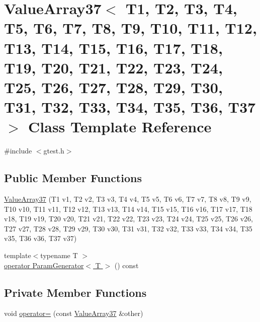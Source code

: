 \hypertarget{classtesting_1_1internal_1_1ValueArray37}{\section{\-Value\-Array37$<$ \-T1, \-T2, \-T3, \-T4, \-T5, \-T6, \-T7, \-T8, \-T9, \-T10, \-T11, \-T12, \-T13, \-T14, \-T15, \-T16, \-T17, \-T18, \-T19, \-T20, \-T21, \-T22, \-T23, \-T24, \-T25, \-T26, \-T27, \-T28, \-T29, \-T30, \-T31, \-T32, \-T33, \-T34, \-T35, \-T36, \-T37 $>$ \-Class \-Template \-Reference}
\label{dc/d48/classtesting_1_1internal_1_1ValueArray37}
}


{\ttfamily \#include $<$gtest.\-h$>$}

\subsection*{\-Public \-Member \-Functions}
\begin{DoxyCompactItemize}
\item 
\hyperlink{classtesting_1_1internal_1_1ValueArray37_ad31713f9c0ce199eb237eadb0b9d782e}{\-Value\-Array37} (\-T1 v1, \-T2 v2, \-T3 v3, \-T4 v4, \-T5 v5, \-T6 v6, \-T7 v7, \-T8 v8, \-T9 v9, \-T10 v10, \-T11 v11, \-T12 v12, \-T13 v13, \-T14 v14, \-T15 v15, \-T16 v16, \-T17 v17, \-T18 v18, \-T19 v19, \-T20 v20, \-T21 v21, \-T22 v22, \-T23 v23, \-T24 v24, \-T25 v25, \-T26 v26, \-T27 v27, \-T28 v28, \-T29 v29, \-T30 v30, \-T31 v31, \-T32 v32, \-T33 v33, \-T34 v34, \-T35 v35, \-T36 v36, \-T37 v37)
\item 
{\footnotesize template$<$typename T $>$ }\\\hyperlink{classtesting_1_1internal_1_1ValueArray37_a08ef46fa12c9dd8ef6fc630baeea89b7}{operator Param\-Generator$<$ T $>$} () const 
\end{DoxyCompactItemize}
\subsection*{\-Private \-Member \-Functions}
\begin{DoxyCompactItemize}
\item 
void \hyperlink{classtesting_1_1internal_1_1ValueArray37_a470bed0046679096d68d1e9ca08c314f}{operator=} (const \hyperlink{classtesting_1_1internal_1_1ValueArray37}{\-Value\-Array37} \&other)
\end{DoxyCompactItemize}
